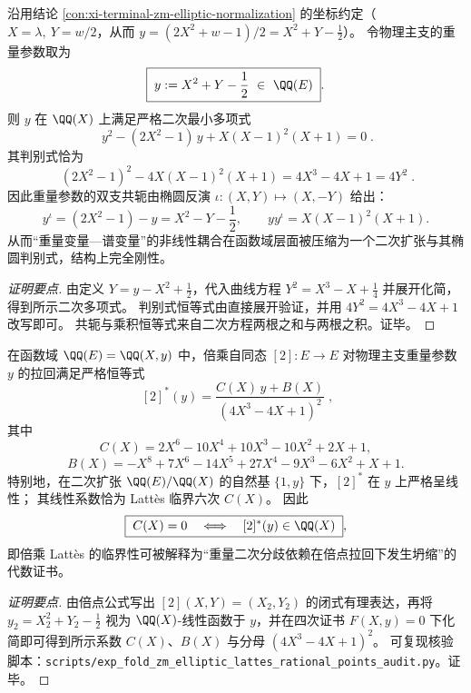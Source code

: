 

\begin{conclusion}\label{con:xi-terminal-zm-y-quadratic-extension-minpoly}\label{con:xi-terminal-zm-elliptic-quadratic-discriminant}
沿用结论 \ref{con:xi-terminal-zm-elliptic-normalization} 的坐标约定（\(X=\lambda,\ Y=w/2\)，从而 \(y=(2X^2+w-1)/2=X^2+Y-\tfrac12\)）。
令物理主支的重量参数取为
\[
\boxed{\;
y:=X^2+Y-\frac12\ \in\ \QQ(E)\; }.
\]
则 \(y\) 在 \(\QQ(X)\) 上满足严格二次最小多项式
\[
\boxed{\;
y^2-(2X^2-1)\,y+X(X-1)^2(X+1)=0\; }.
\]
其判别式恰为
\[
\boxed{\;
(2X^2-1)^2-4X(X-1)^2(X+1)
=4X^3-4X+1
=4Y^2\; }.
\]
因此重量参数的双支共轭由椭圆反演 \(\iota:(X,Y)\mapsto(X,-Y)\) 给出：
\[
y^{\iota}=(2X^2-1)-y
=X^2-Y-\frac12,
\qquad
yy^{\iota}=X(X-1)^2(X+1).
\]
从而“重量变量—谱变量”的非线性耦合在函数域层面被压缩为一个二次扩张与其椭圆判别式，结构上完全刚性。
\end{conclusion}
\begin{proof}[证明要点]
由定义 \(Y=y-X^2+\frac12\)，代入曲线方程 \(Y^2=X^3-X+\frac14\) 并展开化简，得到所示二次多项式。
判别式恒等式由直接展开验证，并用 \(4Y^2=4X^3-4X+1\) 改写即可。
共轭与乘积恒等式来自二次方程两根之和与两根之积。证毕。
\end{proof}

\begin{conclusion}\label{con:xi-terminal-zm-elliptic-y-doubling-linear}
在函数域 \(\QQ(E)=\QQ(X,y)\) 中，倍乘自同态 \([2]:E\to E\) 对物理主支重量参数 \(y\) 的拉回满足严格恒等式
\[
\boxed{\;
[2]^*(y)=\frac{C(X)\,y+B(X)}{(4X^3-4X+1)^2}\; },
\]
其中
\[
C(X)=2X^{6}-10X^{4}+10X^{3}-10X^{2}+2X+1,
\]
\[
B(X)=-X^{8}+7X^{6}-14X^{5}+27X^{4}-9X^{3}-6X^{2}+X+1.
\]
特别地，在二次扩张 \(\QQ(E)/\QQ(X)\) 的自然基 \(\{1,y\}\) 下，\([2]^*\) 在 \(y\) 上严格呈线性；
其线性系数恰为 Latt\`es 临界六次 \(C(X)\)。
因此
\[
\boxed{\;
C(X)=0\quad\Longleftrightarrow\quad [2]^*(y)\in \QQ(X)\; } ,
\]
即倍乘 Latt\`es 的临界性可被解释为“重量二次分歧依赖在倍点拉回下发生坍缩”的代数证书。
\end{conclusion}
\begin{proof}[证明要点]
由倍点公式写出 \([2](X,Y)=(X_2,Y_2)\) 的闭式有理表达，再将 \(y_2=X_2^2+Y_2-\tfrac12\) 视为 \(\QQ(X)\)-线性函数于 \(y\)，并在四次证书 \(F(X,y)=0\) 下化简即可得到所示系数 \(C(X)\)、\(B(X)\) 与分母 \((4X^3-4X+1)^2\)。
可复现核验脚本：\texttt{scripts/exp\_fold\_zm\_elliptic\_lattes\_rational\_points\_audit.py}。证毕。
\end{proof}

